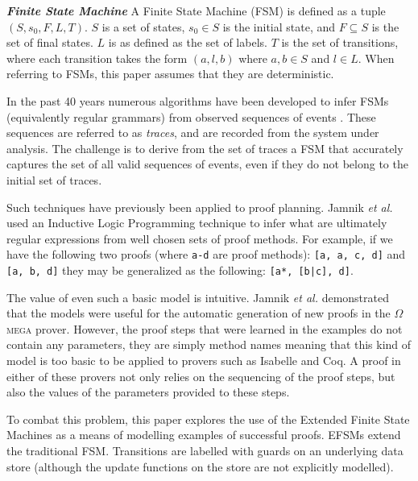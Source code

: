 \documentclass{llncs}
\begin{document}
\begin{definition}\textbf{\emph{Finite State Machine}}
\label{def:fsm}
 A Finite State Machine (FSM) is defined as a tuple $(S,s_0,F,L,T)$. $S$ is a set of states, $s_0 \in S$ is the initial state, and $F \subseteq S$ is the set of final states. $L$ is as defined as the set of labels. $T$ is the set of transitions, where each transition takes the form $(a,l,b)$ where $a,b \in S$ and $l \in L$. When referring to FSMs, this paper assumes that they are deterministic.
\end{definition}

In the past 40 years numerous algorithms have been developed to infer FSMs (equivalently regular grammars) from observed sequences of events \cite{Biermann72,Lang98,WalkinshawStam13}. These sequences are referred to as \emph{traces}, and are recorded from the system under analysis. The challenge is to derive from the set of traces a FSM that accurately captures the set of all valid sequences of events, even if they do not belong to the initial set of traces.

Such techniques have previously been applied to proof planning. Jamnik \emph{et al.} \cite{Jamnik03} used an Inductive Logic Programming technique to infer what are ultimately regular expressions from well chosen sets of proof methods. For example, if we have the following two proofs (where \texttt{a-d} are proof methods): \texttt{[a, a, c, d]} and \texttt{[a, b, d]} they may be generalized as the following: \texttt{[a*, [b|c], d]}.  

The value of even such a basic model is intuitive. Jamnik \emph{et al.} demonstrated that the models were useful for the automatic generation of new proofs in the $\Omega$\textsc{mega} prover. However, the proof steps that were learned in the examples do not contain any parameters, they are simply method names meaning that this kind of model is too basic to be applied to provers such as Isabelle and Coq. A proof in either of these provers not only relies on the sequencing of the proof steps, but also the values of the parameters provided to these steps.

To combat this problem, this paper explores the use of the Extended Finite State Machines \cite{Cheng93} as a means of modelling examples of successful proofs. EFSMs extend the traditional FSM. Transitions are labelled with guards on an underlying data store (although the update functions on the store are not explicitly modelled).
\end{document}
